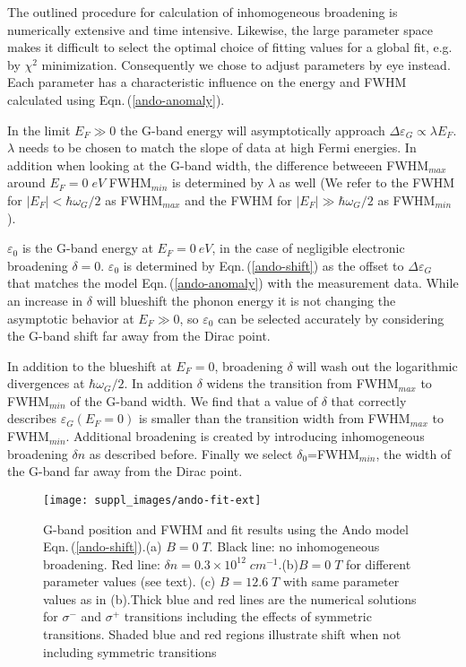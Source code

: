 \documentclass[pra,aps,superscriptaddress,preprint]{revtex4-1}
\begin{document}
The outlined procedure for calculation of inhomogeneous broadening is numerically extensive and time intensive. Likewise, the large parameter space makes it difficult to select the optimal choice of fitting values for a global fit, e.g. by $\chi^2$ minimization. Consequently we chose to adjust parameters by eye instead. Each parameter has a characteristic influence on the energy and FWHM calculated using Eqn.\,(\ref{ando-anomaly}).

\noindent
In the limit $E_F\gg 0$ the G-band energy will asymptotically approach $\Delta \varepsilon_G \propto \lambda E_F$. $\lambda$ needs to be chosen to match the slope of data at high Fermi energies. In addition when looking at the G-band width, the difference betweeen FWHM$_{max}$ around $E_F=0\; eV$ FWHM$_{min}$ is determined by $\lambda$ as well (We refer to the FWHM for $|E_F|<\hbar\omega_G /2$ as FWHM$_{max}$ and the FWHM for $|E_F|\gg \hbar\omega_G /2$ as FWHM$_{min}$).

\noindent
$\varepsilon_0$ is the G-band energy at $E_F=0\: eV$, in the case of negligible electronic broadening $\delta = 0$. $\varepsilon_0$ is determined by Eqn.\,(\ref{ando-shift}) as the offset to $\Delta \varepsilon_G$ that matches the model Eqn.\,(\ref{ando-anomaly}) with the measurement data. While an increase in $\delta$ will blueshift the phonon energy it is not changing the asymptotic behavior at $E_F\gg 0$, so $\varepsilon_0$ can be selected accurately by considering the G-band shift far away from the Dirac point.

In addition to the blueshift at $E_F = 0$, broadening $\delta$ will wash out the logarithmic divergences at $\hbar\omega_G /2$. In addition $\delta$ widens the transition from FWHM$_{max}$ to FWHM$_{min}$ of the G-band width.
We find that a value of $\delta$ that correctly describes $\varepsilon_G(E_F=0)$ is smaller than the transition width from FWHM$_{max}$ to FWHM$_{min}$. Additional broadening is created by introducing inhomogeneous broadening $\delta n$ as described before. 
Finally we select $\delta_0$=FWHM$_{min}$, the width of the G-band far away from the Dirac point.

\begin{figure}[!ht]
   \texttt{[image: suppl\_images/ando-fit-ext]}
   \caption{\label{ando-fit-ext}G-band position and FWHM and fit results using the Ando model Eqn.\,(\ref{ando-shift}).(a) $B=0\; T$. Black line: no inhomogeneous broadening. Red line: $\delta n = 0.3\times 10^{12}\; cm^{-1}$.(b)$B=0\; T$ for different parameter values (see text). (c) $B=12.6\; T$ with same parameter values as in (b).Thick blue and red lines are the numerical solutions for $\sigma^-$ and $\sigma^+$ transitions including the effects of symmetric transitions. Shaded blue and red regions illustrate shift when not including symmetric transitions}
\end{figure}
\end{document}
